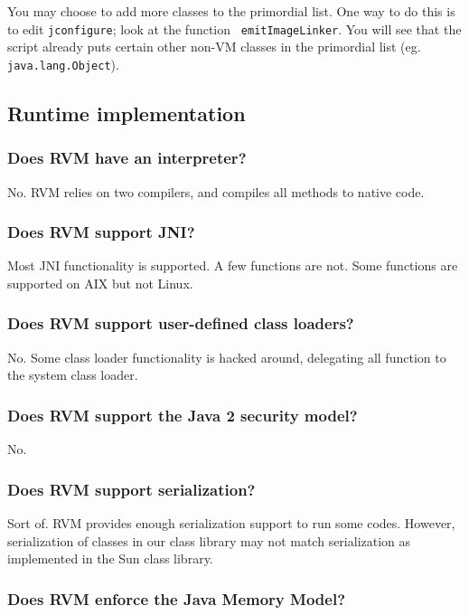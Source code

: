 You may choose to add more classes to the primordial list.  One way to do
this is to edit {\tt jconfigure}; look at the function {\tt
emitImageLinker}.  You will see that the script already puts certain other
non-VM classes in the primordial list (eg. {\tt java.lang.Object}).

\subsection{Runtime implementation}

\subsubsection{Does RVM have an interpreter?}

No.  RVM relies on two compilers, and compiles all methods to native code.

\subsubsection{Does RVM support JNI?}

Most JNI functionality is supported. A few functions are not. 
Some functions are supported on AIX
but not Linux.

\subsubsection{Does RVM support user-defined class loaders?}

No. Some class loader functionality is hacked around, delegating all
function to the system class loader.  

\subsubsection{Does RVM support the Java 2 security model?}

No. 

\subsubsection{Does RVM support serialization?}

Sort of.  RVM provides enough serialization support to run some codes.  
However, serialization of classes in our class library may not match
serialization as implemented in the Sun class library.

\subsubsection{Does RVM enforce the Java Memory Model?}

